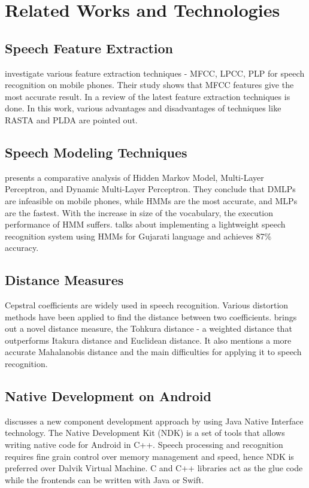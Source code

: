 \chapter{Related Works and Technologies} \label{ch:survey}

\section{Speech Feature Extraction}
\cite{1327109} investigate various feature extraction techniques - MFCC, LPCC, PLP for speech recognition on mobile phones. Their study shows that MFCC features give the most accurate result. In 
\cite{divya} a review of the latest feature extraction techniques is done. In this work, various advantages and disadvantages of techniques like RASTA and PLDA are pointed out. 

\section{Speech Modeling Techniques}
\cite{Mustafa2017} presents a comparative analysis of Hidden Markov Model, Multi-Layer Perceptron, and Dynamic Multi-Layer Perceptron. They conclude that DMLPs are infeasible on mobile phones, while HMMs are the most accurate, and MLPs are the fastest. With the increase in size of the vocabulary, the execution performance of HMM suffers. \cite{10.1007/978-981-10-3920-1_46} talks about implementing a lightweight speech recognition system using HMMs for Gujarati language and achieves 87\% accuracy.

\section{Distance Measures}
Cepstral coefficients are widely used in speech recognition. Various distortion methods have been applied to find the distance between two coefficients. \cite{1165058} brings out a novel distance measure, the Tohkura distance - a weighted distance that outperforms Itakura distance and Euclidean distance. It also mentions a more accurate Mahalanobis distance and the main difficulties for applying it to speech recognition.

\section{Native Development on Android}
\cite{5600170} discusses a new component development approach by using Java Native Interface technology. The Native Development Kit (NDK) is a set of tools that allows writing native code for Android in C++. Speech processing and recognition requires fine grain control over memory management and speed, hence NDK is preferred over Dalvik Virtual Machine. C and C++ libraries act as the glue code while the frontends can be written with Java or Swift.

